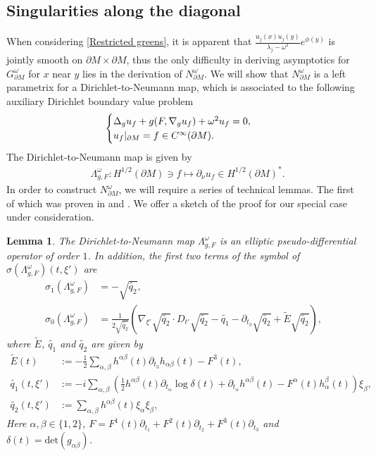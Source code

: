 \documentclass[12pt,a4paper]{amsart}
\numberwithin{equation}{section}
\theoremstyle{plain}
\newtheorem{lemma}[theorem]{Lemma}
\theoremstyle{definition}
\begin{document}
\subsection{Singularities along the diagonal}
 When considering \eqref{Restricted greens}, it is apparent that $\frac{u_j(x)u_j(y)}{\lambda_j-\omega^2}e^{\phi(y)}$ is jointly smooth on $\partial M\times \partial M$, thus the only difficulty in deriving asymptotics for $G^\omega_{\partial M}$ for $x$ near $y$ lies in the derivation of $N^\omega_{\partial M}$. We will show that $N_{\partial M}^\omega$ is a left parametrix for a Dirichlet-to-Neumann map, which is associated to the following auxiliary Dirichlet boundary value problem
    \begin{equation}\label{Auxiliary Problem}
        \begin{cases}
            \Delta_g u_f +g(F,\nabla_g u_f)+\omega^2u_f = 0,\\
            u_f\arrowvert_{\partial M} = f\in C^\infty(\partial M).
        \end{cases}
    \end{equation}
    The Dirichlet-to-Neumann map is given by 
    \begin{align*}
        &\Lambda_{g,F}^\omega: H^{1/2}(\partial M)\ni f \mapsto \partial_\nu u_f \in H^{1/2}(\partial M)^*.
    \end{align*}
In order to construct $N^\omega_{\partial M}$, we will require a series of technical lemmas. The first of which was proven in \cite{LLSConformalLaplacian} and \cite{LeeUhlmann89}. We offer a sketch of the proof for our special case under consideration.
\begin{lemma}\label{DtN Map lemma}
    The Dirichlet-to-Neumann map $\Lambda^\omega_{g,F}$ is an elliptic pseudo-differential operator of order $1$. In addition, the first two terms of the symbol of $\sigma(\Lambda^\omega_{g,F})(t,\xi')$ are 
    \begin{align*}
			\sigma_1(\Lambda_{g,F}^\omega) &= -\sqrt{\widetilde{q_2}}, \\
			\sigma_0(\Lambda_{g,F}^\omega) &= \frac{1}{2\sqrt{\widetilde{q_2}}}(\nabla_{\xi'}\sqrt{\widetilde{q_2}}\cdot D_{t'}\sqrt{\widetilde{q_2}}-\widetilde{q_1}-\partial_{t_3}\sqrt{\widetilde{q_2}} +\widetilde{E}\sqrt{\widetilde{q_2}}),
    \end{align*}
    where $\widetilde{E}$, $\widetilde{q_1}$ and $\widetilde{q_2}$ are given by 
    \begin{align*}
			\widetilde{E}(t) &:= -\frac{1}{2}\sum_{\alpha,\beta} h^{\alpha\beta}(t)\partial_{t_3}h_{\alpha\beta}(t)-F^3(t),\\
			\widetilde{q_1}(t,\xi')&:=-i\sum_{\alpha,\beta} \left(\frac{1}{2}h^{\alpha\beta}(t)\partial_{t_\alpha}\log \delta(t) +\partial_{t_\alpha} h^{\alpha\beta}(t) - F^\alpha(t)h^\beta_\alpha(t)\right)\xi_\beta,\\ 
			\widetilde{q_2}(t,\xi')&:=\sum_{\alpha,\beta} h^{\alpha\beta}(t)\xi_\alpha\xi_\beta,
    \end{align*}
    Here $\alpha,\beta\in \{1,2\}$,  $F=F^1(t)\partial_{t_1}+F^2(t)\partial_{t_2}+F^3(t)\partial_{t_3}$ and $\delta(t)=\mathrm{det}(g_{\alpha\beta})$.
\end{lemma}
\end{document}

